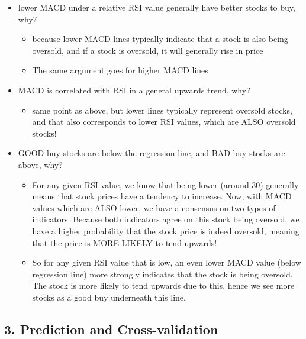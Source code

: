 \documentclass[
]{article}
\providecommand{\tightlist}{%
  \setlength{\itemsep}{0pt}\setlength{\parskip}{0pt}}
\begin{document}
\begin{itemize}
\item
  lower MACD under a relative RSI value generally have better stocks to
  buy, why?

  \begin{itemize}
  \item
    because lower MACD lines typically indicate that a stock is also
    being oversold, and if a stock is oversold, it will generally rise
    in price
  \item
    The same argument goes for higher MACD lines
  \end{itemize}
\item
  MACD is correlated with RSI in a general upwards trend, why?

  \begin{itemize}
  \tightlist
  \item
    same point as above, but lower lines typically represent oversold
    stocks, and that also corresponds to lower RSI values, which are
    ALSO oversold stocks!
  \end{itemize}
\item
  GOOD buy stocks are below the regression line, and BAD buy stocks are
  above, why?

  \begin{itemize}
  \item
    For any given RSI value, we know that being lower (around 30)
    generally means that stock prices have a tendency to increase. Now,
    with MACD values which are ALSO lower, we have a consensus on two
    types of indicators. Because both indicators agree on this stock
    being oversold, we have a higher probability that the stock price is
    indeed oversold, meaning that the price is MORE LIKELY to tend
    upwards!
  \item
    So for any given RSI value that is low, an even lower MACD value
    (below regression line) more strongly indicates that the stock is
    being oversold. The stock is more likely to tend upwards due to
    this, hence we see more stocks as a good buy underneath this line.
  \end{itemize}
\end{itemize}

\hypertarget{prediction-and-cross-validation}{%
\subsection{3. Prediction and
Cross-validation}\label{prediction-and-cross-validation}}
\end{document}
